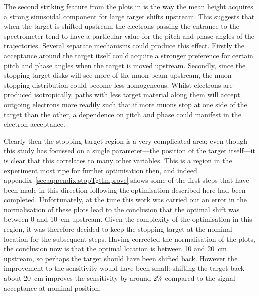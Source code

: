 The second striking feature from the plots in  is the way the mean height acquires a strong sinusoidal component for large target shifts upstream.
This suggests that when the target is shifted upstream the electrons passing the entrance to the spectrometer tend to have a particular value for the pitch and phase angles of the trajectories.
Several separate mechanisms could produce this effect.
Firstly the acceptance around the target itself could acquire a stronger preference for certain pitch and phase angles when the target is moved upstream.
Secondly, since the stopping target disks will see more of the muon beam upstream, the muon stopping distribution could become less homogeneous.
Whilst electrons are produced isotropically, paths with less target material along them will accept outgoing electrons more readily such that if more muons stop at one side of the target than the other, a dependence on pitch and phase could manifest in the electron acceptance.

Clearly then the stopping target region is a very complicated area; even though this study has focussed on a single parameter---the position of the target itself---it is clear that this correlates to many other variables.
This is a region in the experiment most ripe for further optimisation then, and indeed appendix~\ref{sec:appendix:stopTgtImprove} shows some of the first steps that have been made in this direction following the optimisation described here had been completed.
Unfortunately, at the time this work was carried out an error in the normalisation of these plots lead to the conclusion that the optimal shift was between 0 and 10~cm upstream.
Given the complexity of the optimisation in this region, it was therefore decided to keep the stopping target at the nominal location for the subsequent steps.
Having corrected the normalisation of the plots, the conclusion now is that the optimal location is between 10 and 20~cm upstream, so perhaps the target should have been shifted back.
However the improvement to the sensitivity would have been small: shifting the target back about 20~cm improves the sensitivity by around 2\% compared to the signal acceptance at nominal position.

